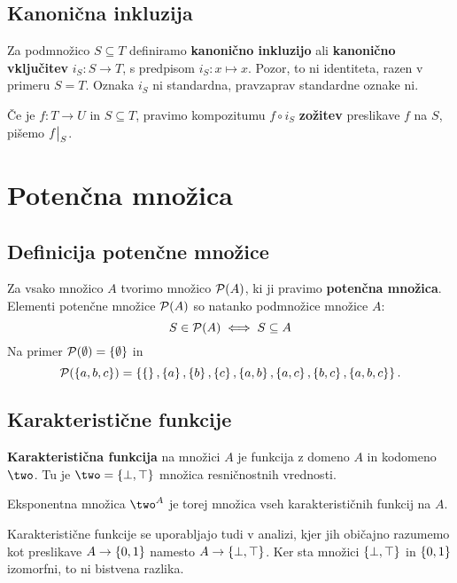 \subsection{Kanonična inkluzija}

Za podmnožico $S \subseteq T$ definiramo \textbf{kanonično inkluzijo} ali \textbf{kanonično vključitev} $i_S : S \to T$, s predpisom $i_S : x \mapsto x$. Pozor, to ni identiteta, razen v primeru $S = T$.
Oznaka $i_S$ ni standardna, pravzaprav standardne oznake ni.

Če je $f : T \to U$ in $S \subseteq T$, pravimo kompozitumu $f \circ i_S$ \textbf{zožitev} preslikave $f$ na $S$, pišemo $f{\big|}_{S}$.


\section{Potenčna množica}

\subsection{Definicija potenčne množice}

Za vsako množico $A$ tvorimo množico $\mathcal{P}(A)$, ki ji pravimo \textbf{potenčna množica}.
Elementi potenčne množice $\mathcal{P}(A)$ so natanko podmnožice množice $A$:
%
\begin{equation*}
    S \in \mathcal{P}(A) \iff S \subseteq A
\end{equation*}
%
Na primer $\mathcal{P}(\emptyset) = \left\{\emptyset\right\}$ in
%
\begin{equation*}
  \mathcal{P}(\left\{a,b,c\right\}) = \left\{\left\{\right\}, \left\{a\right\}, \left\{b\right\}, \left\{c\right\}, \left\{a,b\right\}, \left\{a,c\right\}, \left\{b,c\right\}, \left\{a,b,c\right\}\right\}.
\end{equation*}


\subsection{Karakteristične funkcije}

\textbf{Karakteristična funkcija} na množici $A$ je funkcija z domeno $A$ in kodomeno $\two$. Tu je $\two = \set{\bot, \top}$ množica resničnostnih vrednosti.

Eksponentna množica $\two^A$ je torej množica vseh karakterističnih funkcij na $A$.

\begin{opomba}
  Karakteristične funkcije se uporabljajo tudi v analizi, kjer jih
  običajno razumemo kot preslikave $A \to \left\{0,1\right\}$ namesto $A \to \left\{\bot, \top\right\}$. Ker sta množici $\left\{\bot,\top\right\}$ in $\left\{0,1\right\}$ izomorfni, to ni bistvena razlika.
\end{opomba}


